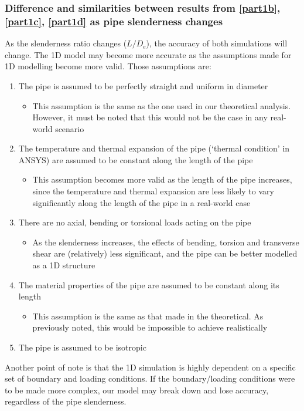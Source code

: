 \subsubsection{Difference and similarities between results from \ref{part1b}, \ref{part1c}, \ref{part1d} as pipe slenderness changes}
As the slenderness ratio changes ($L/D_e$), the accuracy of both simulations will change. The 1D model may become more accurate as the assumptions made for 1D modelling become more valid. Those assumptions are:
\begin{enumerate}
    \item The pipe is assumed to be perfectly straight and uniform in diameter
          \begin{itemize}
              \item This assumption is the same as the one used in our theoretical analysis. However, it must be noted that this would not be the case in any real-world scenario
          \end{itemize}
    \item The temperature and thermal expansion of the pipe (`thermal condition' in ANSYS) are assumed to be constant along the length of the pipe
          \begin{itemize}
              \item This assumption becomes more valid as the length of the pipe increases, since the temperature and thermal expansion are less likely to vary significantly along the length of the pipe in a real-world case
          \end{itemize}
    \item There are no axial, bending or torsional loads acting on the pipe
          \begin{itemize}
              \item As the slenderness increases, the effects of bending, torsion and transverse shear are (relatively) less significant, and the pipe can be better modelled as a 1D structure
          \end{itemize}
    \item The material properties of the pipe are assumed to be constant along its length
          \begin{itemize}
              \item This assumption is the same as that made in the theoretical. As previously noted, this would be impossible to achieve realistically
          \end{itemize}
    \item The pipe is assumed to be isotropic
\end{enumerate}
Another point of note is that the 1D simulation is highly dependent on a specific set of boundary and loading conditions. If the boundary/loading conditions were to be made more complex, our model may break down and lose accuracy, regardless of the pipe slenderness.

